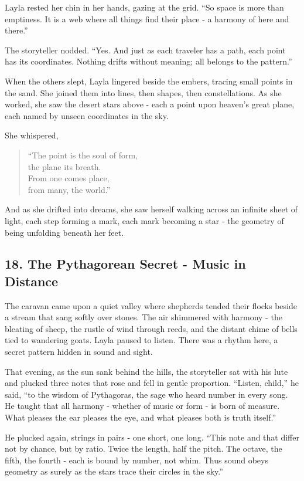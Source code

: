 \documentclass[
  letterpaper,
  DIV=11,
  numbers=noendperiod]{scrreprt}
\begin{document}
Layla rested her chin in her hands, gazing at the grid. ``So space is
more than emptiness. It is a web where all things find their place - a
harmony of here and there.''

The storyteller nodded. ``Yes. And just as each traveler has a path,
each point has its coordinates. Nothing drifts without meaning; all
belongs to the pattern.''

When the others slept, Layla lingered beside the embers, tracing small
points in the sand. She joined them into lines, then shapes, then
constellations. As she worked, she saw the desert stars above - each a
point upon heaven's great plane, each named by unseen coordinates in the
sky.

She whispered,

\begin{quote}
``The point is the soul of form,\\
the plane its breath.\\
From one comes place,\\
from many, the world.''
\end{quote}

And as she drifted into dreams, she saw herself walking across an
infinite sheet of light, each step forming a mark, each mark becoming a
star - the geometry of being unfolding beneath her feet.

\subsection{18. The Pythagorean Secret - Music in
Distance}\label{the-pythagorean-secret---music-in-distance}

The caravan came upon a quiet valley where shepherds tended their flocks
beside a stream that sang softly over stones. The air shimmered with
harmony - the bleating of sheep, the rustle of wind through reeds, and
the distant chime of bells tied to wandering goats. Layla paused to
listen. There was a rhythm here, a secret pattern hidden in sound and
sight.

That evening, as the sun sank behind the hills, the storyteller sat with
his lute and plucked three notes that rose and fell in gentle
proportion. ``Listen, child,'' he said, ``to the wisdom of Pythagoras,
the sage who heard number in every song. He taught that all harmony -
whether of music or form - is born of measure. What pleases the ear
pleases the eye, and what pleases both is truth itself.''

He plucked again, strings in pairs - one short, one long. ``This note
and that differ not by chance, but by ratio. Twice the length, half the
pitch. The octave, the fifth, the fourth - each is bound by number, not
whim. Thus sound obeys geometry as surely as the stars trace their
circles in the sky.''
\end{document}
